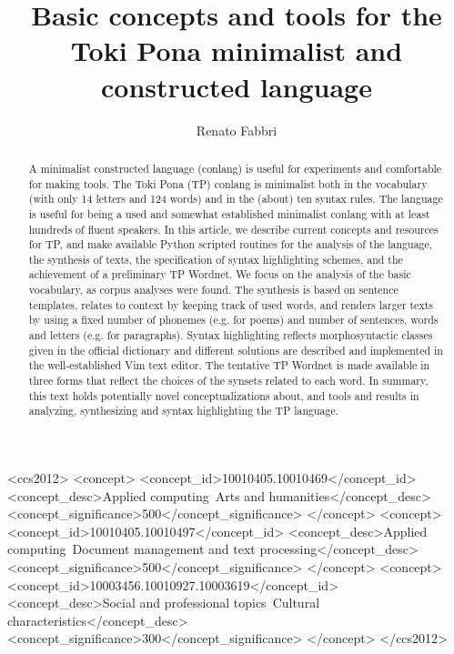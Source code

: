 \documentclass[acmlarge]{acmart}
\begin{document}
\title{Basic concepts and tools for the Toki Pona minimalist and
constructed language}

\author{Renato Fabbri}



\begin{abstract}
A minimalist constructed language (conlang)
is useful for experiments and comfortable for making tools.
The Toki Pona (TP) conlang is minimalist both in the vocabulary
(with only 14 letters and 124 words)
  and in the (about) ten syntax rules.
The language is useful for being a used and somewhat established
minimalist conlang with at least hundreds of fluent speakers.
In this article, we describe current concepts and resources
for TP,
and make available Python scripted routines for
the analysis of the language,
the synthesis of texts, the specification of syntax highlighting
schemes, and the achievement of a preliminary TP
Wordnet.
We focus on the analysis of the basic vocabulary,
as corpus analyses were found.
The synthesis is based on sentence templates,
relates to context by keeping track of used words,
and renders larger texts by using a fixed number of phonemes (e.g. for poems)
and number of sentences, words and letters (e.g. for paragraphs).
Syntax highlighting 
reflects morphosyntactic classes given in the official dictionary
and different solutions are described and implemented
in the well-established Vim text editor.
The tentative TP Wordnet is made available in three forms that
reflect the choices of the synsets related to each word.
In summary, this text holds potentially novel conceptualizations about,
and tools and results in analyzing, synthesizing and syntax highlighting the
TP language.
\end{abstract}


%
%
\begin{CCSXML}
<ccs2012>
 <concept>
  <concept_id>10010405.10010469</concept_id>
  <concept_desc>Applied computing~Arts and humanities</concept_desc>
  <concept_significance>500</concept_significance>
 </concept>
 <concept>
  <concept_id>10010405.10010497</concept_id>
  <concept_desc>Applied computing~Document management and text processing</concept_desc>
  <concept_significance>500</concept_significance>
 </concept>
 <concept>
  <concept_id>10003456.10010927.10003619</concept_id>
  <concept_desc>Social and professional topics~Cultural characteristics</concept_desc>
  <concept_significance>300</concept_significance>
 </concept>
</ccs2012>
\end{CCSXML}
\end{document}

